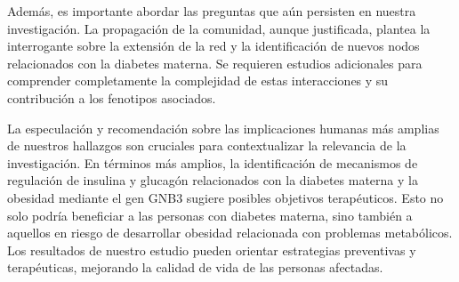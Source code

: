 Además, es importante abordar las preguntas que aún persisten en nuestra investigación. La propagación de la comunidad, aunque justificada, plantea la interrogante sobre la extensión de la red y la identificación de nuevos nodos relacionados con la diabetes materna. Se requieren estudios adicionales para comprender completamente la complejidad de estas interacciones y su contribución a los fenotipos asociados.

La especulación y recomendación sobre las implicaciones humanas más amplias de nuestros hallazgos son cruciales para contextualizar la relevancia de la investigación. En términos más amplios, la identificación de mecanismos de regulación de insulina y glucagón relacionados con la diabetes materna y la obesidad\cite{Shah2011} mediante el gen GNB3 sugiere posibles objetivos terapéuticos. Esto no solo podría beneficiar a las personas con diabetes materna, sino también a aquellos en riesgo de desarrollar obesidad relacionada con problemas metabólicos. Los resultados de nuestro estudio pueden orientar estrategias preventivas y terapéuticas, mejorando la calidad de vida de las personas afectadas.

